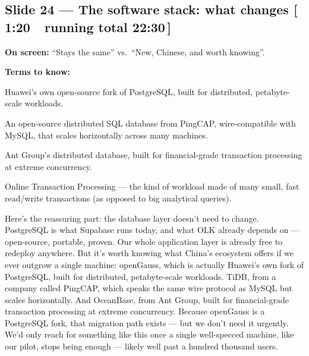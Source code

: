 \documentclass[11pt]{article}
\newcommand{\onscreen}[1]{\noindent\textbf{\color{sovGrey}On screen:} #1\par\vspace{4pt}}
\newcommand{\timing}[2]{\hfill{\normalsize\color{sovGrey}[\,#1\ \textbar\ running total #2\,]}}
\newenvironment{terms}
  {\noindent\textbf{\color{sovGrey}Terms to know:}
   \begin{description}[leftmargin=0pt,style=sameline,labelindent=0pt,itemsep=2pt,topsep=2pt,font=\normalfont\bfseries\color{sovDark}]}
  {\end{description}\vspace{2pt}}
\begin{document}
\subsection*{Slide 24 --- The software stack: what changes \timing{1:20}{22:30}}
\onscreen{``Stays the same'' vs.\ ``New, Chinese, and worth knowing''.}
\begin{terms}
  \item[openGauss] Huawei's own open-source fork of PostgreSQL, built for
    distributed, petabyte-scale workloads.
  \item[TiDB] An open-source distributed SQL database from PingCAP, wire-compatible
    with MySQL, that scales horizontally across many machines.
  \item[OceanBase] Ant Group's distributed database, built for financial-grade
    transaction processing at extreme concurrency.
  \item[OLTP] Online Transaction Processing --- the kind of workload made of many
    small, fast read/write transactions (as opposed to big analytical queries).
\end{terms}
\begin{sayit}
Here's the reassuring part: the database layer doesn't need to change. PostgreSQL is
what Supabase runs today, and what OLK already depends on --- open-source, portable,
proven. Our whole application layer is already free to redeploy anywhere. But it's worth
knowing what China's ecosystem offers if we ever outgrow a single machine: openGauss,
which is actually Huawei's own fork of PostgreSQL, built for distributed, petabyte-scale
workloads. TiDB, from a company called PingCAP, which speaks the same wire protocol as
MySQL but scales horizontally. And OceanBase, from Ant Group, built for financial-grade
transaction processing at extreme concurrency. Because openGauss is a PostgreSQL fork,
that migration path exists --- but we don't need it urgently. We'd only reach for
something like this once a single well-specced machine, like our pilot, stops being
enough --- likely well past a hundred thousand users.
\end{sayit}
\end{document}
